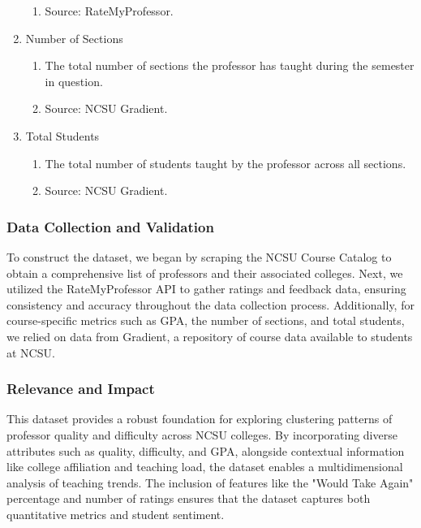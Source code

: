 \documentclass[sigconf,nonacm]{acmart}
\begin{document}
\begin{enumerate}
\begin{enumerate}
    \item Source: RateMyProfessor.
\end{enumerate}
\item Number of Sections
\begin{enumerate}
    \item The total number of sections the professor has taught during the semester in question.  
     \item Source: NCSU Gradient.
 \end{enumerate}
 \item Total Students
 \begin{enumerate}
     \item The total number of students taught by the professor across all sections.
     \item Source: NCSU Gradient.
 \end{enumerate}
\end{enumerate}



\subsubsection{Data Collection and Validation}

To construct the dataset, we began by scraping the NCSU Course Catalog to obtain a comprehensive list of professors and their associated colleges. Next, we utilized the RateMyProfessor API to gather ratings and feedback data, ensuring consistency and accuracy throughout the data collection process. Additionally, for course-specific metrics such as GPA, the number of sections, and total students, we relied on data from Gradient, a repository of course data available to students at NCSU.


\subsubsection{Relevance and Impact}

This dataset provides a robust foundation for exploring clustering patterns of professor quality and difficulty across NCSU colleges. By incorporating diverse attributes such as quality, difficulty, and GPA, alongside contextual information like college affiliation and teaching load, the dataset enables a multidimensional analysis of teaching trends. The inclusion of features like the "Would Take Again" percentage and number of ratings ensures that the dataset captures both quantitative metrics and student sentiment.
\end{document}
